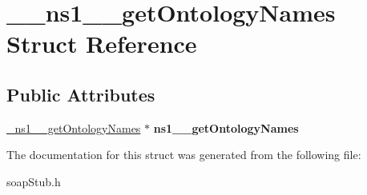 \hypertarget{struct____ns1____getOntologyNames}{
\section{\_\-\_\-ns1\_\-\_\-getOntologyNames Struct Reference}
\label{struct____ns1____getOntologyNames}
}
\subsection*{Public Attributes}
\begin{DoxyCompactItemize}
\item 
\hypertarget{struct____ns1____getOntologyNames_a1d1384e335730ca7c543b40a12260892}{
\hyperlink{class__ns1____getOntologyNames}{\_\-ns1\_\-\_\-getOntologyNames} $\ast$ {\bfseries ns1\_\-\_\-getOntologyNames}}
\label{struct____ns1____getOntologyNames_a1d1384e335730ca7c543b40a12260892}

\end{DoxyCompactItemize}


The documentation for this struct was generated from the following file:\begin{DoxyCompactItemize}
\item 
soapStub.h\end{DoxyCompactItemize}
